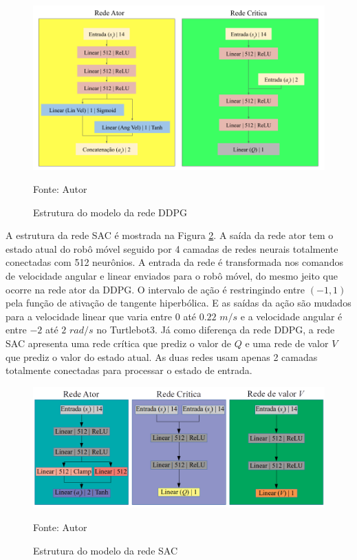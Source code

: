 \begin{figure}[H]
\caption{Estrutura do modelo da rede DDPG}
\centerline{\includegraphics[width=\columnwidth]{imagens/ddpg_structure.png}}
\small{Fonte: Autor}
\label{fig:ddpg_struct}
\end{figure}

A estrutura da rede SAC é mostrada na Figura \ref{fig:sac_struct}.
A saída da rede ator tem o estado atual do robô móvel seguido por 4 camadas de redes neurais totalmente conectadas com 512 neurônios.
A entrada da rede é transformada nos comandos de velocidade angular e linear enviados para o robô móvel, do mesmo jeito que ocorre na rede ator da DDPG.
O intervalo de ação é restringindo entre $(-1,1)$ pela função de ativação de tangente hiperbólica. 
E as saídas da ação são mudados para a velocidade linear que varia entre $0$ até $0.22$ $m/s$ e a velocidade angular é entre $-2$ até $2$ $rad/s$ no Turtlebot3.
Já como diferença da rede DDPG, a rede SAC apresenta uma rede crítica que prediz o valor de $Q$ e uma rede de valor $V$ que prediz o valor do estado atual.
As duas redes usam apenas 2 camadas totalmente conectadas para processar o estado de entrada.

\begin{figure}[H]
\caption{Estrutura do modelo da rede SAC}
\centerline{\includegraphics[width=\columnwidth]{imagens/sac_structure.png}}
\small{Fonte: Autor}
\label{fig:sac_struct}
\end{figure}

